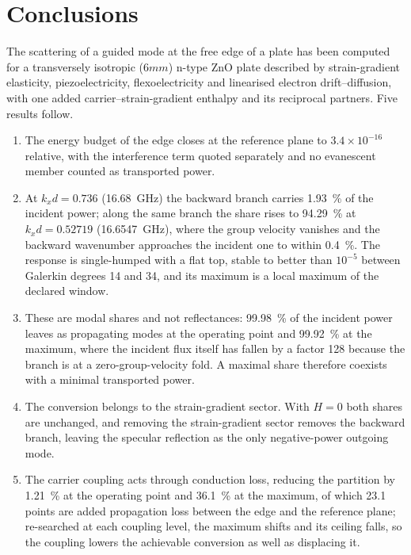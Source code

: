 \section{Conclusions}
\label{sec:conclusions}

The scattering of a guided mode at the free edge of a plate has been computed
for a transversely isotropic ($6mm$) n-type ZnO plate described by
strain-gradient elasticity, piezoelectricity, flexoelectricity and linearised
electron drift--diffusion, with one added carrier--strain-gradient enthalpy and
its reciprocal partners.  Five results follow.

\begin{enumerate}
\item The energy budget of the edge closes at the reference plane to
$3.4\times10^{-16}$ relative, with the interference term quoted separately and
no evanescent member counted as transported power.
\item At $k_xd=0.736$ (\SI{16.68}{\giga\hertz}) the backward branch carries
\SI{1.93}{\percent} of the incident power; along the same branch the share rises
to \SI{94.29}{\percent} at $k_xd=0.52719$ (\SI{16.6547}{\giga\hertz}), where the
group velocity vanishes and the backward wavenumber approaches the incident one
to within \SI{0.4}{\percent}.  The response is single-humped with a flat top,
stable to better than $10^{-5}$ between Galerkin degrees 14 and 34, and its maximum
is a local maximum of the declared window.
\item These are modal shares and not reflectances: \SI{99.98}{\percent} of the
incident power leaves as propagating modes at the operating point and
\SI{99.92}{\percent} at the maximum, where the incident flux itself has fallen
by a factor 128 because the branch is at a zero-group-velocity fold.  A maximal
share therefore coexists with a minimal transported power.
\item The conversion belongs to the strain-gradient sector.  With $H=0$ both
shares are unchanged, and removing the strain-gradient sector removes the
backward branch, leaving the specular reflection as the only negative-power
outgoing mode.
\item The carrier coupling acts through conduction loss, reducing the partition
by \SI{1.21}{\percent} at the operating point and \SI{36.1}{\percent} at the
maximum, of which \SI{23.1}{} points are added propagation loss between the edge
and the reference plane; re-searched at each coupling level, the maximum shifts
and its ceiling falls, so the coupling lowers the achievable conversion as well
as displacing it.
\end{enumerate}

